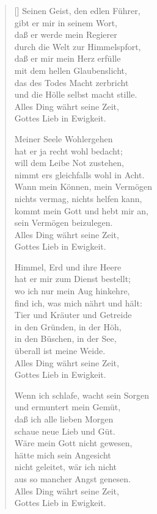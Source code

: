 \begin{multicols}{2}
\begin{verse}[\versewidth]
 Seinen Geist, den edlen Führer,\\
gibt er mir in seinem Wort,\\
daß er werde mein Regierer\\
durch die Welt zur Himmelspfort,\\
daß er mir mein Herz erfülle\\
mit dem hellen Glaubenslicht,\\
das des Todes Macht zerbricht\\
und die Hölle selbst macht stille.\\
Alles Ding währt seine Zeit,\\
Gottes Lieb in Ewigkeit.

 Meiner Seele Wohlergehen\\
hat er ja recht wohl bedacht;\\
will dem Leibe Not zustehen,\\
nimmt ers gleichfalls wohl in Acht.\\
Wann mein Können, mein Vermögen\\
nichts vermag, nichts helfen kann,\\
kommt mein Gott und hebt mir an,\\
sein Vermögen beizulegen.\\
Alles Ding währt seine Zeit,\\
Gottes Lieb in Ewigkeit.

\vfill\null
\columnbreak

 Himmel, Erd und ihre Heere\\
hat er mir zum Dienst bestellt;\\
wo ich nur mein Aug hinkehre,\\
find ich, was mich nährt und hält:\\
Tier und Kräuter und Getreide\\
in den Gründen, in der Höh,\\
in den Büschen, in der See,\\
überall ist meine Weide.\\
Alles Ding währt seine Zeit,\\
Gottes Lieb in Ewigkeit.

 Wenn ich schlafe, wacht sein Sorgen\\
und ermuntert mein Gemüt,\\
daß ich alle lieben Morgen\\
schaue neue Lieb und Güt.\\
Wäre mein Gott nicht gewesen,\\
hätte mich sein Angesicht\\
nicht geleitet, wär ich nicht\\
aus so mancher Angst genesen.\\
Alles Ding währt seine Zeit,\\
Gottes Lieb in Ewigkeit.


\end{verse}
\end{multicols}
